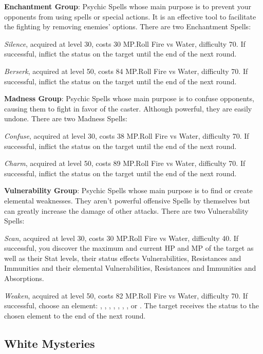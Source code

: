 \begin{multicols}{2}
    \textbf{Enchantment Group}: Psychic Spells whose main purpose is to prevent your opponents from using spells or special actions. It is an effective tool to facilitate the fighting by removing enemies’ options. There are two Enchantment Spells:

    \textit{Silence}, acquired at level 30, costs 30 MP.\@{}Roll Fire vs Water, difficulty 70. If successful, inflict the  status on the target until the end of the next round.

    \textit{Berserk}, acquired at level 50, costs 84 MP.\@{}Roll Fire vs Water, difficulty 70. If successful, inflict the  status on the target until the end of the next round.

    \textbf{Madness Group}: Psychic Spells whose main purpose is to confuse opponents, causing them to fight in favor of the caster. Although powerful, they are easily undone. There are two Madness Spells:

    \textit{Confuse}, acquired at level 30, costs 38 MP.\@{}Roll Fire vs Water, difficulty 70. If successful, inflict the  status on the target until the end of the next round.

    \textit{Charm}, acquired at level 50, costs 89 MP.\@{}Roll Fire vs Water, difficulty 70. If successful, inflict the  status on the target until the end of the next round.

    \textbf{Vulnerability Group}: Psychic Spells whose main purpose is to find or create elemental weaknesses. They aren’t powerful offensive Spells by themselves but can greatly increase the damage of other attacks. There are two Vulnerability Spells:

    \textit{Scan}, acquired at level 30, costs 30 MP.\@{}Roll Fire vs Water, difficulty 40. If successful, you discover the maximum and current HP and MP of the target as well as their Stat levels, their status effects Vulnerabilities, Resistances and Immunities and their elemental Vulnerabilities, Resistances and Immunities and Absorptions.

    \textit{Weaken}, acquired at level 50, costs 82 MP.\@{}Roll Fire vs Water, difficulty 70. If successful, choose an element: , , , , , , ,  or . The target receives the status  to the chosen element to the end of the next round. 

    \subsection{White Mysteries}\label{subsec:white-mysteries}


\end{multicols}
